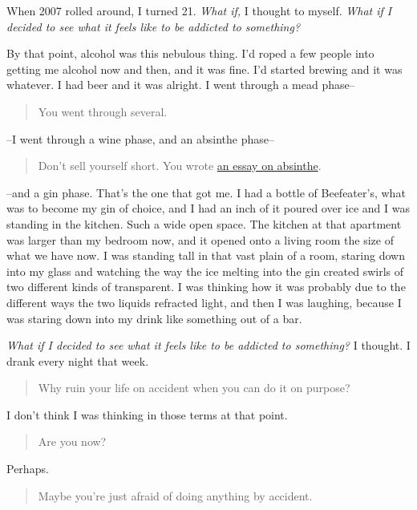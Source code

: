 When 2007 rolled around, I turned 21. \emph{What if,} I thought to myself. \emph{What if I decided to see what it feels like to be addicted to something?}

By that point, alcohol was this nebulous thing. I'd roped a few people into getting me alcohol now and then, and it was fine. I'd started brewing and it was whatever. I had beer and it was alright. I went through a mead phase--

\begin{quote}
You went through several.
\end{quote}

--I went through a wine phase, and an absinthe phase--

\begin{quote}
Don't sell yourself short. You wrote \href{https://writing.drab-makyo.com/non-fiction/tasting/new-american-absinthe/}{an essay on absinthe}.
\end{quote}

--and a gin phase. That's the one that got me. I had a bottle of Beefeater's, what was to become my gin of choice, and I had an inch of it poured over ice and I was standing in the kitchen. Such a wide open space. The kitchen at that apartment was larger than my bedroom now, and it opened onto a living room the size of what we have now. I was standing tall in that vast plain of a room, staring down into my glass and watching the way the ice melting into the gin created swirls of two different kinds of transparent. I was thinking how it was probably due to the different ways the two liquids refracted light, and then I was laughing, because I was staring down into my drink like something out of a bar.

\emph{What if I decided to see what it feels like to be addicted to something?} I thought. I drank every night that week.

\begin{quote}
Why ruin your life on accident when you can do it on purpose?
\end{quote}

I don't think I was thinking in those terms at that point.

\begin{quote}
Are you now?
\end{quote}

Perhaps.

\begin{quote}
Maybe you're just afraid of doing anything by accident.
\end{quote}

